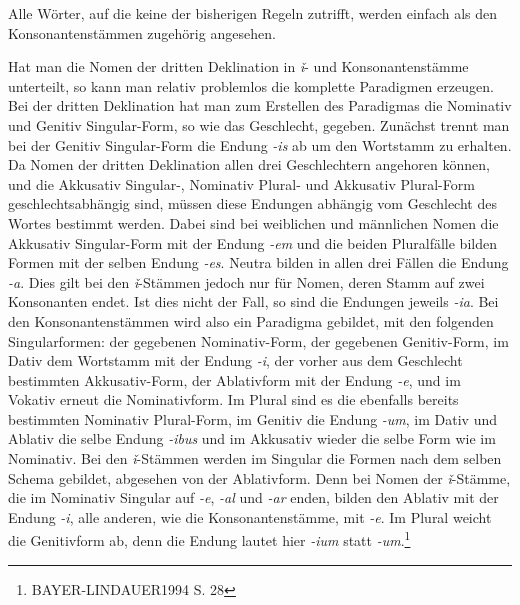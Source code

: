 \documentclass[12pt,abstract=on,titlepage,bibliography=totoc,ngerman,listof=totoc]{scrreprt}
\begin{document}
Alle Wörter, auf die keine der bisherigen Regeln zutrifft, werden einfach als den Konsonantenstämmen zugehörig angesehen. \par
Hat man die Nomen der dritten Deklination in \textit{ǐ}- und Konsonantenstämme unterteilt, so kann man relativ problemlos die komplette Paradigmen erzeugen. Bei der dritten Deklination hat man zum Erstellen des Paradigmas die Nominativ und Genitiv Singular-Form, so wie das Geschlecht, gegeben. Zunächst trennt man bei der Genitiv Singular-Form die Endung \textit{-is} ab um den Wortstamm zu erhalten. Da Nomen der dritten Deklination allen drei Geschlechtern angehoren können, und die Akkusativ Singular-, Nominativ Plural- und Akkusativ Plural-Form geschlechtsabhängig sind, müssen diese Endungen abhängig vom Geschlecht des Wortes bestimmt werden. Dabei sind bei weiblichen und männlichen Nomen die Akkusativ Singular-Form mit der Endung \textit{-em} und die beiden Pluralfälle bilden Formen mit der selben Endung \textit{-es}. Neutra bilden in allen drei Fällen die Endung \textit{-a}. Dies gilt bei den \textit{ǐ}-Stämmen jedoch nur für Nomen, deren Stamm auf zwei Konsonanten endet. Ist dies nicht der Fall, so sind die Endungen jeweils \textit{-ia}. Bei den Konsonantenstämmen wird also ein Paradigma gebildet, mit den folgenden Singularformen: der gegebenen Nominativ-Form, der gegebenen Genitiv-Form, im Dativ dem Wortstamm mit der Endung \textit{-i}, der vorher aus dem Geschlecht bestimmten Akkusativ-Form, der Ablativform mit der Endung \textit{-e}, und im Vokativ erneut die Nominativform. Im Plural sind es die ebenfalls bereits bestimmten Nominativ Plural-Form, im Genitiv die Endung \textit{-um}, im Dativ und Ablativ die selbe Endung \textit{-ibus} und im Akkusativ wieder die selbe Form wie im Nominativ. Bei den \textit{ǐ}-Stämmen werden im Singular die Formen nach dem selben Schema gebildet, abgesehen von der Ablativform. Denn bei Nomen der \textit{ǐ}-Stämme, die im Nominativ Singular auf \textit{-e}, \textit{-al} und \textit{-ar} enden, bilden den Ablativ mit der Endung \textit{-i}, alle anderen, wie die Konsonantenstämme, mit \textit{-e}. Im Plural weicht die Genitivform ab, denn die Endung lautet hier \textit{-ium} statt \textit{-um}.\footnote{BAYER-LINDAUER1994 S. 28} \par
\end{document}
